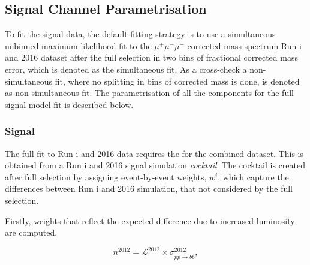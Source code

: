 \subsection{Signal Channel Parametrisation}
\label{sigpara}
To fit the signal data, the default fitting strategy is to use a simultaneous unbinned maximum likelihood fit to the $\mu^{+} \mu^{-} \mu^{+}$ corrected mass spectrum \DIFdelbegin {}\DIFdelend \DIFaddbegin {}\DIFaddend Run \Rn{1} and 2016 dataset after the full selection in two bins of fractional corrected mass error, which is denoted as the simultaneous fit. \DIFaddbegin {}\DIFaddend As a cross-check a non-simultaneous fit, where no splitting in bins of corrected mass is done, is denoted as \DIFaddbegin {}\DIFaddend non-simultaneous fit. The parametrisation of all the components for the full signal model fit is described below.


\subsubsection{Signal}
The full fit to Run \Rn{1} and 2016 data requires the \DIFdelbegin {}\DIFdelend \DIFaddbegin {}\DIFaddend for the combined dataset. This is obtained from a Run \Rn{1} and 2016 signal simulation \textit{cocktail}. The cocktail is created after full selection by assigning event-by-event weights, \textit{$w^{i}$}, which capture the differences between \DIFaddbegin {}\DIFaddend Run \Rn{1} and 2016 simulation, that \DIFdelbegin {}\DIFdelend \DIFaddbegin {}\DIFaddend not considered by the full selection.

Firstly, weights that reflect the expected difference due to \DIFaddbegin {}\DIFaddend increased luminosity are computed. \DIFdelbegin {}\DIFdelend \DIFaddbegin {}\DIFaddend 

\begin{equation}
n^{2012}=\mathcal{L}^{2012} \times \sigma^{2012}_{pp \rightarrow b \overline{b}},
\end{equation}

